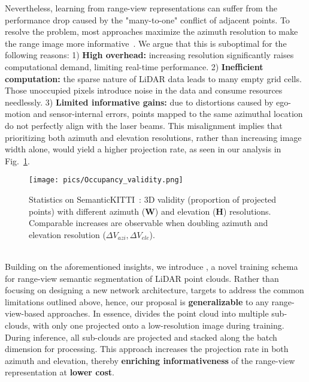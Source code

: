 Nevertheless, learning from range-view representations can suffer from the performance drop caused by the "many-to-one" conflict of adjacent points. To resolve the problem, most approaches maximize the azimuth resolution to make the range image more informative~\cite{2019rangenet++, cortinhal2020salsanext, cheng2022cenet, zhao2021fidnet, gu2022maskrange, kong2023rethinking}. We argue that this is suboptimal for the following reasons: 1) \textbf{High overhead: }increasing resolution significantly raises computational demand, limiting real-time performance. 2) \textbf{Inefficient computation: }the sparse nature of LiDAR data leads to many empty grid cells. Those unoccupied pixels introduce noise in the data and consume resources needlessly. 3) \textbf{Limited informative gains: } due to distortions caused by ego-motion and sensor-internal errors, points mapped to the same azimuthal location do not perfectly align with the laser beams. This misalignment implies that prioritizing both azimuth and elevation resolutions, rather than increasing image width alone, would yield a higher projection rate, as seen in our analysis in Fig.~\ref{fig:occupancy}.
\begin{figure}[b]
\vspace{-7mm}
  \centering
    \texttt{[image: pics/Occupancy\_validity.png]}
    \caption{Statistics on SemanticKITTI~\cite{behley2019semantickitti}: 3D validity (proportion of projected points) with different azimuth (\textbf{W}) and elevation (\textbf{H}) resolutions. Comparable increases are observable when doubling azimuth and elevation resolution ($\Delta V_{azi}, \Delta V_{ele}$).}
    \label{fig:occupancy}
    \vspace{-3mm}
\end{figure}\\
Building on the aforementioned insights, we introduce \coolname{}, a novel training schema for range-view semantic segmentation of LiDAR point clouds. Rather than focusing on designing a new network architecture, \coolname{} targets to address the common limitations outlined above, hence, our proposal is \textbf{generalizable} to any range-view-based approaches. In essence, \coolname{} divides the point cloud into multiple sub-clouds, with only one projected onto a low-resolution image during training. During inference, all sub-clouds are projected and stacked along the batch dimension for processing. This approach increases the projection rate in both azimuth and elevation, thereby \textbf{enriching informativeness} of the range-view representation at \textbf{lower cost}. \\
